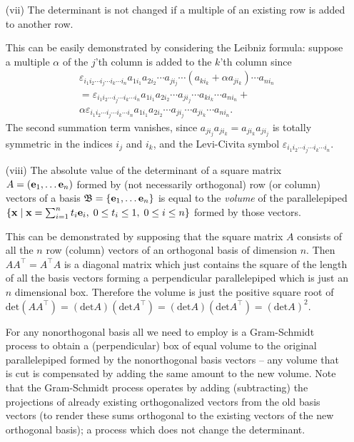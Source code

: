 \begin{itemize}
\item[(vii)]
The determinant is not changed if a multiple of an existing row is added to another row.

{\color{OliveGreen}
\bproof
This can be easily demonstrated by considering the Leibniz formula: suppose a multiple $\alpha$
of the $j$'th column is added to the $k$'th column since
\begin{equation}
\begin{split}
\varepsilon_{i_1 i_2\cdots i_j \cdots i_k \cdots i_n} a_{1i_1}a_{2i_2} \cdots a_{j i_j} \cdots (a_{k i_k} + \alpha a_{j i_k}) \cdots a_{ni_n}\\
=
\varepsilon_{i_1 i_2\cdots i_j \cdots i_k \cdots i_n} a_{1i_1}a_{2i_2} \cdots a_{j i_j} \cdots  a_{k i_k} \cdots a_{ni_n} +\\
\alpha \varepsilon_{i_1 i_2\cdots i_j \cdots i_k \cdots i_n} a_{1i_1}a_{2i_2} \cdots a_{j i_j} \cdots   a_{j i_k} \cdots a_{ni_n}.
\end{split}
\end{equation}
The second summation term vanishes, since
$
a_{j i_j} a_{j i_k}
=
a_{j i_k} a_{j i_j}
$
is totally symmetric in the indices $i_j$ and $i_k$,
and the Levi-Civita symbol $\varepsilon_{i_1 i_2\cdots i_j \cdots i_k \cdots i_n}$.
\eproof
}

\item[(viii)]
The absolute value of the determinant of a square matrix $A= \left({\bf e}_1, \ldots {\bf e}_n \right)$ formed by (not necessarily orthogonal)
row (or column) vectors of a basis
$\frak B= \{ {\bf e}_1, \ldots {\bf e}_n\}$
is equal to the {\em volume} of the parallelepiped
$
\left\{ {\bf x} \mid {\bf x} =\sum_{i=1}^n t_i {\bf e}_i, \; 0 \le t_i \le 1, \; 0\le i \le n \right\}
$
formed by those vectors.

{\color{OliveGreen}
\bproof
This can be demonstrated 
by supposing that
the square matrix $A$ consists of all the $n$ row (column) vectors of an orthogonal basis of dimension $n$.
Then
$AA^\intercal =A^\intercal A$ is a  diagonal matrix  which just contains the square of the
length of all the basis vectors forming a perpendicular parallelepiped which
is just an $n$ dimensional box.
Therefore the volume is just the positive square root of
$\textrm{det} ( AA^\intercal  ) =
(\textrm{det} A) (\textrm{det} A^\intercal  ) = (\textrm{det} A) (\textrm{det} A^\intercal  )=(\textrm{det} A)^2$.

For any nonorthogonal basis all we need to employ is a Gram-Schmidt process
to obtain a (perpendicular) box of equal volume to the original parallelepiped
formed by the nonorthogonal basis vectors --
any volume that is cut is compensated by adding the same amount to the new volume.
Note that the Gram-Schmidt process operates by adding (subtracting) the projections
of already existing orthogonalized vectors
from the old basis vectors (to render these sums orthogonal to the existing vectors of the new orthogonal basis);
a process which does not change the determinant.
\eproof
}


\end{itemize}
